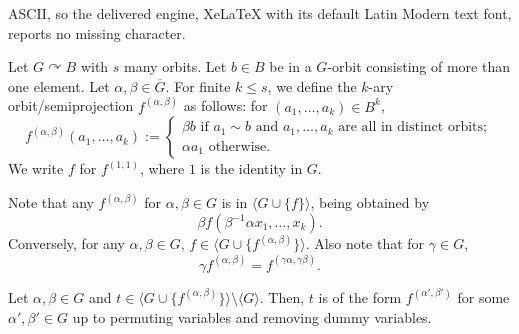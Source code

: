 \documentclass[10pt,a4paper]{amsart}
\def\acts{\curvearrowright}
\begin{document}
ASCII, so the delivered engine, XeLaTeX with its default Latin Modern text font, reports no missing character.
\begin{definition}\label{def:palfy} Let $G\acts B$ with $s$ many orbits. Let $b\in B$ be in a $G$-orbit consisting of more than one element. Let {$\alpha,\beta\in\overline{G}$.} For finite $k\leq s$, we define the $k$-ary orbit\-/semiprojection $f^{(\alpha, \beta)}$ as follows: for $(a_1, \dots, a_k)\in B^k$, 
\begin{equation*}
 f^{(\alpha, \beta)}(a_1, \dots, a_k):=
    \begin{cases}
       \beta b \text{ if } a_1\sim b \text{ and } a_1, \dots, a_k \text{ are all in distinct orbits};\\
        \alpha a_1 \text{ otherwise.}
        \end{cases}
        \end{equation*}
We write $f$ for $f^{(1, 1)}$, where $1$ is the identity in $G$.
\end{definition}

\begin{remark}\label{rem:stuffinstuff} Note that any $f^{(\alpha, \beta)}$ for $\alpha, \beta\in G$ is in $\langle G\cup\{f\}\rangle$, being obtained by
\[\beta f(\beta^{-1}\alpha x_1, \dots, x_k).\] 
Conversely, for any $\alpha, \beta\in G$, $f\in \langle G\cup\{f^{(\alpha, \beta)}\}\rangle$. Also note that for $\gamma\in G$,
\[\gamma f^{(\alpha, \beta)}=f^{(\gamma\alpha, \gamma\beta)}.\]

\end{remark}

\begin{lemma}\label{lem:everythingpalfy} {Let $\alpha, \beta\in G$ and $t\in\langle G \cup \{f^{(\alpha, \beta)}\}\rangle \setminus \langle G\rangle$. Then, $t$ is of the form $f^{(\alpha', \beta')}$ for some $\alpha', \beta'\in G$ up to permuting variables and removing dummy variables.}
\end{lemma}
\end{document}
